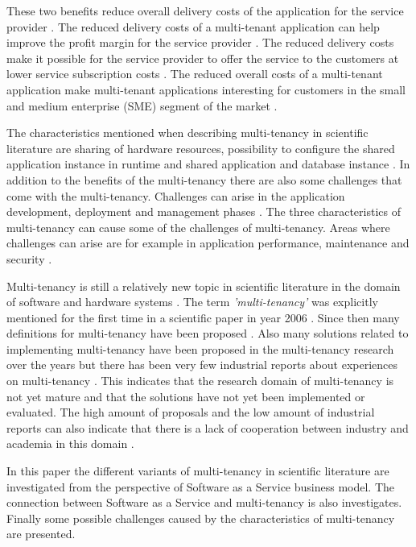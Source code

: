 \documentclass[conference]{sasmoota2017}
\begin{document}
These two benefits reduce overall delivery costs of the application for the service provider \cite{Bezemer:2010:MaintenanceDream}. The reduced delivery costs of a multi-tenant application can help improve the profit margin for the service provider \cite{Guo:2007:FrameworkForNative}. The reduced delivery costs make it possible for the service provider to offer the service to the customers at lower service subscription costs \cite{Guo:2007:FrameworkForNative}. The reduced overall costs of a multi-tenant application make multi-tenant applications interesting for customers in the small and medium enterprise (SME) segment of the market \cite{Bezemer:2010:MaintenanceDream}.

The characteristics mentioned when describing multi-tenancy in scientific literature are sharing of hardware resources, possibility to configure the shared application instance in runtime and shared application and database instance \cite{Bezemer:2010:MaintenanceDream}. In addition to the benefits of the multi-tenancy there are also some challenges that come with the multi-tenancy. Challenges can arise in the application development, deployment and management phases \cite{Guo:2007:FrameworkForNative}. The three characteristics of multi-tenancy can cause some of the challenges of multi-tenancy. Areas where challenges can arise are for example in application performance, maintenance and security \cite{Bezemer:2010:MaintenanceDream}. 

Multi-tenancy is still a relatively new topic in scientific literature in the domain of software and hardware systems \cite{Kabbedijk2015:Defining}. The term \textit{'multi-tenancy'} was explicitly mentioned for the first time in a scientific paper in year 2006 \cite{Kabbedijk2015:Defining, Carraro:2006:ArchitectureLongTail}. Since then many definitions for multi-tenancy have been proposed \cite{Kabbedijk2015:Defining}. Also many solutions related to implementing multi-tenancy have been proposed in the multi-tenancy research over the years but there has been very few industrial reports about experiences on multi-tenancy \cite{Kabbedijk2015:Defining}. This indicates that the research domain of multi-tenancy is not yet mature and that the solutions have not yet been implemented or evaluated. The high amount of proposals and the low amount of industrial reports can also indicate that there is a lack of cooperation between industry and academia in this domain \cite{Kabbedijk2015:Defining}.

In this paper the different variants of multi-tenancy in scientific literature are investigated from the perspective of Software as a Service business model. The connection between Software as a Service and multi-tenancy is also investigates. Finally some possible challenges caused by the characteristics of multi-tenancy are presented.
\end{document}

